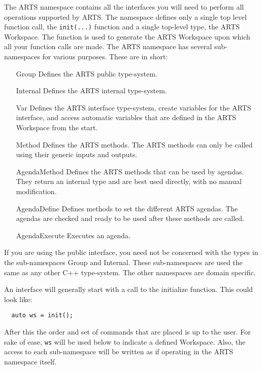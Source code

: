The ARTS namespace contains all the interfaces you will need to perform
all operations supported by ARTS.  The namespace defines only a single
top level function call, the  \verb|init(...)| function and a single
top-level type, the ARTS Workspace.  The function is used to generate the ARTS Workspace
upon which all your function calls are made.  The ARTS namespace has several 
sub-namespaces for various purposes.  These are in short:
\begin{itemize}
 \item[Group] Defines the ARTS public type-system.
 \item[Internal] Defines the ARTS internal type-system.
 \item[Var] Defines the ARTS interface type-system,
                  create variables for the ARTS interface, and
                  access automatic variables that are defined in the ARTS Workspace
                  from the start.
 \item[Method] Defines the ARTS methods.  The ARTS methods can only be called
                     using their generic inputs and outputs.
 \item[AgendaMethod] Defines the ARTS methods that can be used by agendas.
                           They return an internal type and are best used directly,
                           with no manual modification.
 \item[AgendaDefine] Defines methods to set the different ARTS agendas.
                           The agendas are checked and ready to be used after these
                           methods are called.
 \item[AgendaExecute] Executes an agenda.
\end{itemize}

If you are using the public interface, you need not be concerned with the types in the sub-namespaces Group and Internal.
These sub-namespaces are used the same as any other C++ type-system.  The other
namespaces are domain specific.

An interface will generally start with a call to the initialize function.
This could look like:
\begin{verbatim}
  auto ws = init();
\end{verbatim}
After this the order and set of commands that are placed is up to the user.
For sake of ease, \verb|ws| will be used below to indicate a defined 
Workspace.  Also, the access to each sub-namespace will be written as if
operating in the ARTS namespace itself.

